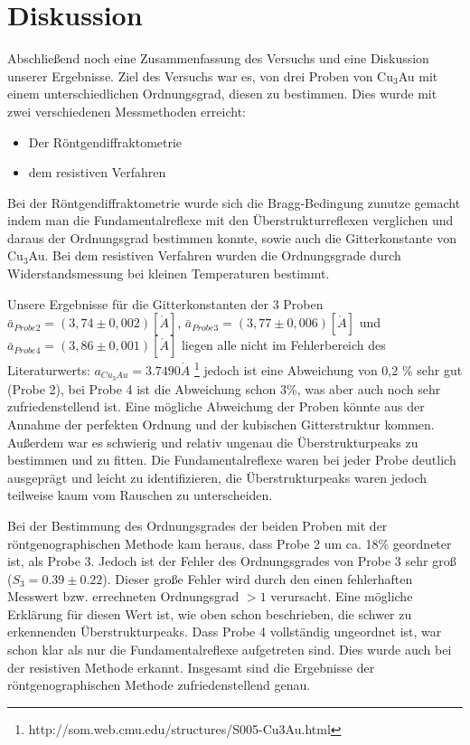 \section{Diskussion}
    Abschließend noch eine Zusammenfassung des Versuchs und eine Diskussion
    unserer Ergebnisse.
    Ziel des Versuchs war es, von drei Proben von Cu$_3$Au mit einem
    unterschiedlichen Ordnungsgrad, diesen zu bestimmen. 
    Dies wurde mit zwei verschiedenen Messmethoden erreicht: 
    \begin{itemize}
        \item Der Röntgendiffraktometrie
        \item dem resistiven Verfahren
    \end{itemize}
    Bei der Röntgendiffraktometrie wurde sich die Bragg-Bedingung zunutze gemacht
    indem man die Fundamentalreflexe mit den Überstrukturreflexen verglichen und 
    daraus der Ordnungsgrad bestimmen konnte, sowie auch die Gitterkonstante
    von Cu$_3$Au. Bei dem resistiven Verfahren wurden die Ordnungsgrade 
    durch Widerstandsmessung bei kleinen Temperaturen bestimmt.

    Unsere Ergebnisse für die Gitterkonstanten der 3 Proben $\bar{a}_{Probe2} = (3,74 \pm 0,002)[\mathring{A}]$,
    $\bar{a}_{Probe3} = (3,77 \pm 0,006)[\mathring{A}]$ und $\bar{a}_{Probe4} = (3,86 \pm 0,001)[\mathring{A}]$ liegen
    alle nicht im Fehlerbereich des Literaturwerts: $a_{Cu_3Au} = 3.7490\mathring{A}$ \footnote{http://som.web.cmu.edu/structures/S005-Cu3Au.html}
    jedoch ist eine Abweichung von 0,2 \% sehr gut (Probe 2), bei Probe 4 ist die Abweichung schon 3\%, was aber 
    auch noch sehr zufriedenstellend ist. Eine mögliche Abweichung der Proben könnte aus der Annahme der perfekten Ordnung und der kubischen Gitterstruktur kommen. Außerdem war es schwierig und relativ ungenau die Überstrukturpeaks zu bestimmen und zu fitten.
    Die Fundamentalreflexe waren bei jeder Probe deutlich ausgeprägt und leicht zu identifizieren, die Überstrukturpeaks 
    waren jedoch teilweise kaum vom Rauschen zu unterscheiden.
    
    Bei der Bestimmung des Ordnungsgrades der beiden Proben mit der röntgenographischen Methode kam heraus, 
    dass Probe 2 um ca. 18\% geordneter ist, als Probe 3. Jedoch ist der Fehler des Ordnungsgrades von Probe 3 sehr groß ($S_3= 0.39\pm 0.22$).
    Dieser große Fehler wird durch den einen fehlerhaften Messwert bzw. errechneten Ordnungsgrad $>1$ verursacht.
    Eine mögliche Erklärung für diesen Wert ist, wie oben schon beschrieben, die schwer zu erkennenden Überstrukturpeaks.
    Dass Probe 4 vollständig ungeordnet ist, war schon klar als nur die Fundamentalreflexe aufgetreten sind. Dies wurde
    auch bei der resistiven Methode erkannt. Insgesamt sind die Ergebnisse der röntgenographischen Methode
    zufriedenstellend genau.

